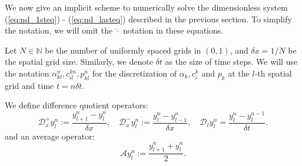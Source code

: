 \documentclass{article}
\begin{document}

We now give an implicit scheme to numerically solve the dimensionless system (\ref{eq:nd_1steq}) - (\ref{eq:nd_lasteq}) described in the previous section.
To simplify the notation, we will omit the $\hat{\cdot}$ notation in these equations.

Let $N\in \mathbb{N}$ be the number of uniformly spaced grids in $(0,1)$, and $\delta x = 1/N$ be the spatial grid size.
Similarly, we denote $\delta t$ as the size of time steps.
We will use the notation $\alpha^{n}_{kl},c_{il}^{kn}, p_{kl}^{n}$ for the discretization of $\alpha_k,c_i^k$ and $p_k$ at the $l$-th spatial grid and time $t = n\delta t$.

We define difference quotient operators:
\begin{equation}
    \mathcal{D}_x^+y^n_l:= \frac{y^n_{l+1}-y^n_{l}}{\delta x},\quad \mathcal{D}_x^- y^n_l :=\frac{y^n_l-y^n_{l-1}}{\delta x},\quad \mathcal{D}_t y^n_l = \frac{y^n_l - y^{n-1}_l}{\delta t}.
\end{equation}
and an average operator:
\begin{equation}
    \mathcal{A} y_l^n := \frac{y^n_{l+1}+y^n_l}{2}.
\end{equation}
\end{document}
